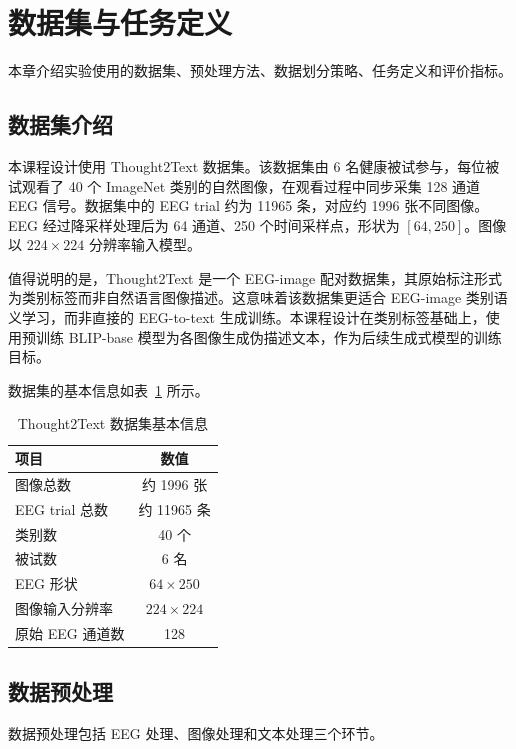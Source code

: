 \section{数据集与任务定义}

本章介绍实验使用的数据集、预处理方法、数据划分策略、任务定义和评价指标。

\subsection{数据集介绍}

本课程设计使用 Thought2Text 数据集。该数据集由 6 名健康被试参与，每位被试观看了 40 个 ImageNet 类别的自然图像，在观看过程中同步采集 128 通道 EEG 信号。数据集中的 EEG trial 约为 11965 条，对应约 1996 张不同图像。EEG 经过降采样处理后为 64 通道、250 个时间采样点，形状为 $[64, 250]$。图像以 $224\times224$ 分辨率输入模型。

值得说明的是，Thought2Text 是一个 EEG-image 配对数据集，其原始标注形式为类别标签而非自然语言图像描述。这意味着该数据集更适合 EEG-image 类别语义学习，而非直接的 EEG-to-text 生成训练。本课程设计在类别标签基础上，使用预训练 BLIP-base 模型为各图像生成伪描述文本，作为后续生成式模型的训练目标。

数据集的基本信息如表~\ref{tab:dataset} 所示。

\begin{table}[htbp]
  \centering
  \caption{Thought2Text 数据集基本信息}
  \label{tab:dataset}
  \begin{tabular}{l c}
    \toprule
    项目 & 数值 \\
    \midrule
    图像总数 & 约 1996 张 \\
    EEG trial 总数 & 约 11965 条 \\
    类别数 & 40 个 \\
    被试数 & 6 名 \\
    EEG 形状 & $64\times250$ \\
    图像输入分辨率 & $224\times224$ \\
    原始 EEG 通道数 & 128 \\
    \bottomrule
  \end{tabular}
\end{table}

\subsection{数据预处理}

数据预处理包括 EEG 处理、图像处理和文本处理三个环节。

